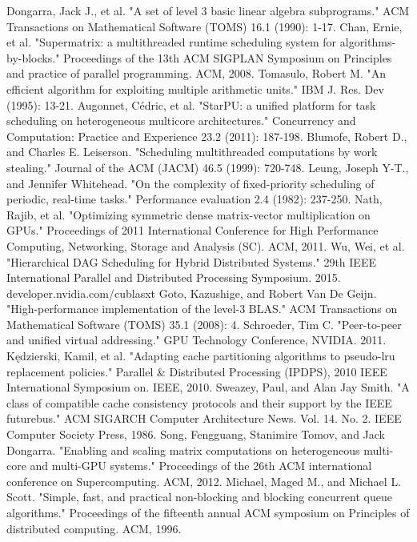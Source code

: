 \documentclass[conference]{IEEEtran}
\begin{document}
\begin{thebibliography}{100}

Dongarra, Jack J., et al. "A set of level 3 basic linear algebra subprograms." ACM Transactions on Mathematical Software (TOMS) 16.1 (1990): 1-17.
Chan, Ernie, et al. "Supermatrix: a multithreaded runtime scheduling system for algorithms-by-blocks." Proceedings of the 13th ACM SIGPLAN Symposium on Principles and practice of parallel programming. ACM, 2008.
Tomasulo, Robert M. "An efficient algorithm for exploiting multiple arithmetic units." IBM J. Res. Dev (1995): 13-21.
Augonnet, Cédric, et al. "StarPU: a unified platform for task scheduling on heterogeneous multicore architectures." Concurrency and Computation: Practice and Experience 23.2 (2011): 187-198.
Blumofe, Robert D., and Charles E. Leiserson. "Scheduling multithreaded computations by work stealing." Journal of the ACM (JACM) 46.5 (1999): 720-748.
Leung, Joseph Y-T., and Jennifer Whitehead. "On the complexity of fixed-priority scheduling of periodic, real-time tasks." Performance evaluation 2.4 (1982): 237-250.
Nath, Rajib, et al. "Optimizing symmetric dense matrix-vector multiplication on GPUs." Proceedings of 2011 International Conference for High Performance Computing, Networking, Storage and Analysis (SC). ACM, 2011.
Wu, Wei, et al. "Hierarchical DAG Scheduling for Hybrid Distributed Systems." 29th IEEE International Parallel and Distributed Processing Symposium. 2015.
developer.nvidia.com/cublasxt
Goto, Kazushige, and Robert Van De Geijn. "High-performance implementation of the level-3 BLAS." ACM Transactions on Mathematical Software (TOMS) 35.1 (2008): 4.
Schroeder, Tim C. "Peer-to-peer and unified virtual addressing." GPU Technology Conference, NVIDIA. 2011.
Kędzierski, Kamil, et al. "Adapting cache partitioning algorithms to pseudo-lru replacement policies." Parallel \& Distributed Processing (IPDPS), 2010 IEEE International Symposium on. IEEE, 2010.
Sweazey, Paul, and Alan Jay Smith. "A class of compatible cache consistency protocols and their support by the IEEE futurebus." ACM SIGARCH Computer Architecture News. Vol. 14. No. 2. IEEE Computer Society Press, 1986.
Song, Fengguang, Stanimire Tomov, and Jack Dongarra. "Enabling and scaling matrix computations on heterogeneous multi-core and multi-GPU systems." Proceedings of the 26th ACM international conference on Supercomputing. ACM, 2012.
Michael, Maged M., and Michael L. Scott. "Simple, fast, and practical non-blocking and blocking concurrent queue algorithms." Proceedings of the fifteenth annual ACM symposium on Principles of distributed computing. ACM, 1996.


\end{thebibliography}
\end{document}
